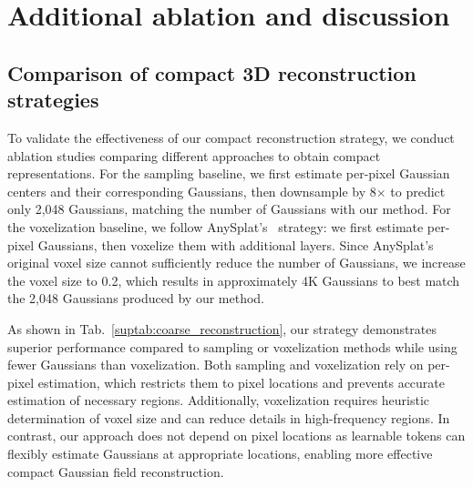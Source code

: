 \section{Additional ablation and discussion}
\label{sec:ablation_discussion}
\subsection{Comparison of compact 3D reconstruction strategies}

To validate the effectiveness of our compact reconstruction strategy, we conduct ablation studies comparing different approaches to obtain compact representations. For the sampling baseline, we first estimate per-pixel Gaussian centers and their corresponding Gaussians, then downsample by 8$\times$ to predict only 2,048 Gaussians, matching the number of Gaussians with our method. For the voxelization baseline, we follow AnySplat's~\cite{jiang2025anysplat} strategy: we first estimate per-pixel Gaussians, then voxelize them with additional layers. Since AnySplat's original voxel size cannot sufficiently reduce the number of Gaussians, we increase the voxel size to 0.2, which results in approximately 4K Gaussians to best match the 2,048 Gaussians produced by our method.

As shown in Tab.~\ref{suptab:coarse_reconstruction}, our strategy demonstrates superior performance compared to sampling or voxelization methods while using fewer Gaussians than voxelization. Both sampling and voxelization rely on per-pixel estimation, which restricts them to pixel locations and prevents accurate estimation of necessary regions. Additionally, voxelization requires heuristic determination of voxel size and can reduce details in high-frequency regions. In contrast, our approach does not depend on pixel locations as learnable tokens can flexibly estimate Gaussians at appropriate locations, enabling more effective compact Gaussian field reconstruction.

